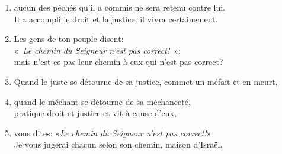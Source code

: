 \begin{enumerate}[leftmargin=\psleftmargin, labelsep = \pslabelsep, label={\arabic*}, font=\color{\pscolor}\small\textsuperscript, parsep=0em, itemsep=0em, topsep=0em ]
    \item aucun des péchés qu’il a commis ne sera retenu contre lui. \\ Il a accompli le droit et la justice: il vivra certainement. \verseSpace
    \item Les gens de ton peuple disent: \\ \decalage «~\textit{Le chemin du Seigneur n’est pas correct!}~»; \\ mais n’est-ce pas leur chemin à eux qui n’est pas correct?
    \item Quand le juste se détourne de sa justice, commet un méfait et en meurt,
    \item quand le méchant se détourne de sa méchanceté, \\ pratique droit et justice et vit à cause d’eux,
    \item vous dites: «\textit{Le chemin du Seigneur n’est pas correct!}» \\ Je vous jugerai chacun selon son chemin, maison d’Israël. \newpage

\end{enumerate}
